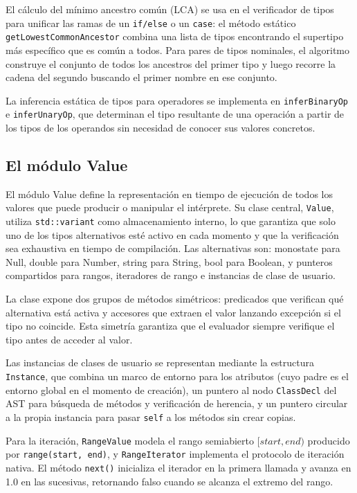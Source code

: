 \documentclass[11pt,a4paper]{article}
\begin{document}
El cálculo del mínimo ancestro común (LCA) se usa en el verificador de tipos para unificar las ramas de un \texttt{if/else} o un \texttt{case}: el método estático \texttt{getLowestCommonAncestor} combina una lista de tipos encontrando el supertipo más específico que es común a todos. Para pares de tipos nominales, el algoritmo construye el conjunto de todos los ancestros del primer tipo y luego recorre la cadena del segundo buscando el primer nombre en ese conjunto.

La inferencia estática de tipos para operadores se implementa en \texttt{inferBinaryOp} e \texttt{inferUnaryOp}, que determinan el tipo resultante de una operación a partir de los tipos de los operandos sin necesidad de conocer sus valores concretos.

\subsection{El módulo Value}

El módulo Value define la representación en tiempo de ejecución de todos los valores que puede producir o manipular el intérprete. Su clase central, \texttt{Value}, utiliza \texttt{std::variant} como almacenamiento interno, lo que garantiza que solo uno de los tipos alternativos esté activo en cada momento y que la verificación sea exhaustiva en tiempo de compilación. Las alternativas son: monostate para Null, double para Number, string para String, bool para Boolean, y punteros compartidos para rangos, iteradores de rango e instancias de clase de usuario.

La clase expone dos grupos de métodos simétricos: predicados que verifican qué alternativa está activa y accesores que extraen el valor lanzando excepción si el tipo no coincide. Esta simetría garantiza que el evaluador siempre verifique el tipo antes de acceder al valor.

Las instancias de clases de usuario se representan mediante la estructura \texttt{Instance}, que combina un marco de entorno para los atributos (cuyo padre es el entorno global en el momento de creación), un puntero al nodo \texttt{ClassDecl} del AST para búsqueda de métodos y verificación de herencia, y un puntero circular a la propia instancia para pasar \texttt{self} a los métodos sin crear copias.

Para la iteración, \texttt{RangeValue} modela el rango semiabierto $[start, end)$ producido por \texttt{range(start, end)}, y \texttt{RangeIterator} implementa el protocolo de iteración nativa. El método \texttt{next()} inicializa el iterador en la primera llamada y avanza en 1.0 en las sucesivas, retornando falso cuando se alcanza el extremo del rango.
\end{document}
